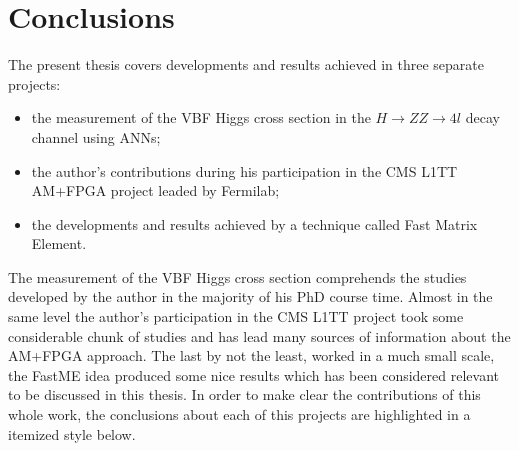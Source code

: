 \chapter*{Conclusions}
The present thesis covers developments and results achieved in three separate projects:
\begin{itemize}
	\item the measurement of the VBF Higgs cross section in the $H \rightarrow ZZ \rightarrow 4l$ decay channel using ANNs;
	\item the author's contributions during his participation in the CMS L1TT AM+FPGA project leaded by Fermilab;
	\item the developments and results achieved by a technique called Fast Matrix Element.
\end{itemize}

The measurement of the VBF Higgs cross section comprehends the studies developed by the author in the majority of his PhD course time. Almost in the same level the author's participation in the CMS L1TT project took some considerable chunk of studies and has lead many sources of information about the AM+FPGA approach. The last by not the least, worked in a much small scale, the FastME idea produced some nice results which has been considered relevant to be discussed in this thesis. In order to make clear the contributions of this whole work, the conclusions about each of this projects are highlighted in a itemized style below.

